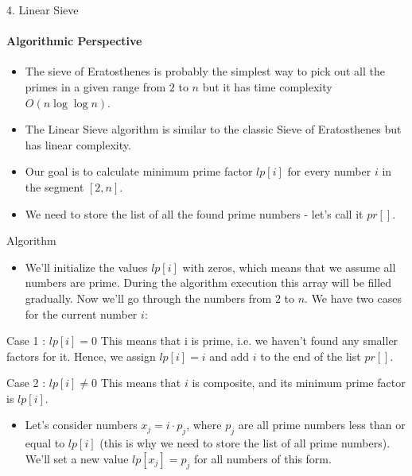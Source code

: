 \documentclass{beamer}
\begin{document}
\begin{frame}{4. Linear Sieve}
\framesubtitle{Algorithmic Perspective}
    \begin{itemize}
        \item The sieve of Eratosthenes is probably the simplest way to pick out all the primes in a given range from $2$ to $n$ but it has time complexity $O\left( n\log \log n\right) $.
        \item The Linear Sieve algorithm is similar to the classic Sieve of Eratosthenes but has linear complexity.
        \item Our goal is to calculate minimum prime factor $lp\left[ i\right] $ for every number $i$ in the segment $\left[ 2,n\right]$.
        \item We need to store the list of all the found prime numbers - let's call it $pr\left[ \right] $.
    \end{itemize}
\end{frame}


\begin{frame}{Algorithm}
    \begin{itemize}
        \item We'll initialize the values $lp\left[ i\right]$ with zeros, which means that we assume all numbers are prime. During the algorithm execution this array will be filled gradually. Now we'll go through the numbers from $2$ to $n$. We have two cases for the current number $i$:
    \end{itemize}
        
    \begin{block}{Case 1 : $lp\left[ i\right]=0$}
        This means that i is prime, i.e. we haven't found any smaller factors for it. Hence, we assign $lp\left[ i\right]=i$ and add $i$ to the end of the list $pr\left[ \right] $.
    \end{block}
    \begin{block}{Case 2 : $lp\left[ i\right]\neq 0$}
        This means that $i$ is composite, and its minimum prime factor is $lp\left[ i\right]$.
    \end{block}
    
    \begin{itemize}
        \item Let's consider numbers $x_{j}=i\cdot p_{j}$, where $ p_{j}$ are all prime numbers less than or equal to $lp\left[ i\right]$ (this is why we need to store the list of all prime numbers).\break
        We'll set a new value $lp\left[ x_{j}\right] =p_{j}$ for all numbers of this form.
    \end{itemize}
\end{frame}
\end{document}
